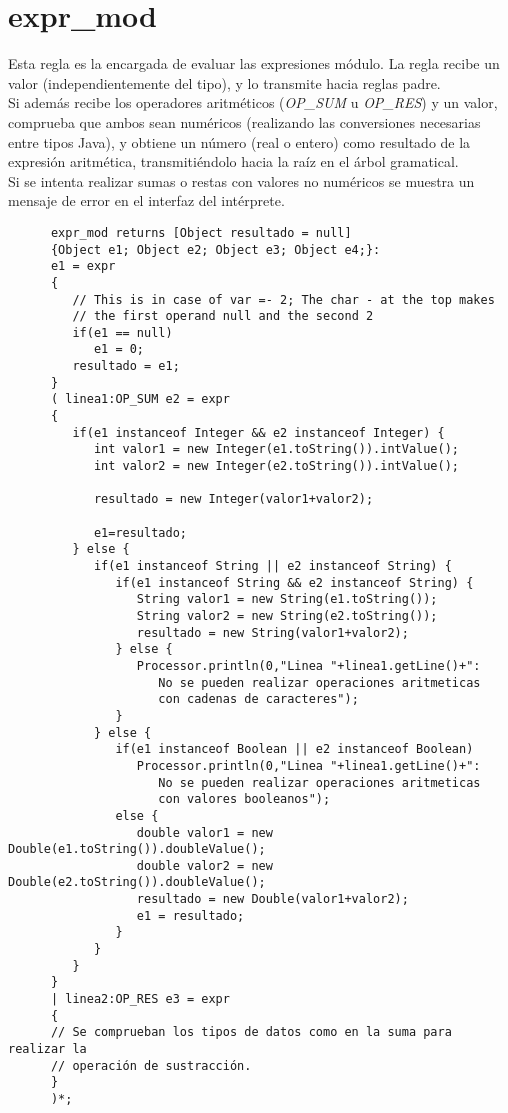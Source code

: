    \section{expr\_mod}
   Esta regla es la encargada de evaluar las expresiones módulo. La regla recibe un valor (independientemente del tipo),
   y lo transmite hacia reglas padre. \\

   Si además recibe los operadores aritméticos (\textit{OP\_SUM} u \textit{OP\_RES}) y un valor, comprueba que ambos sean numéricos 
   (realizando las conversiones necesarias entre tipos Java), y obtiene un número (real o entero) como resultado de la expresión aritmética,
   transmitiéndolo hacia la raíz en el árbol gramatical.\\

   Si se intenta realizar sumas o restas con valores no numéricos se muestra un mensaje de error en el interfaz del intérprete.
   \begin{lstlisting}
      expr_mod returns [Object resultado = null]
      {Object e1; Object e2; Object e3; Object e4;}: 
      e1 = expr
      {
         // This is in case of var =- 2; The char - at the top makes 
         // the first operand null and the second 2
         if(e1 == null)
            e1 = 0;
         resultado = e1;
      }
      ( linea1:OP_SUM e2 = expr
      {
         if(e1 instanceof Integer && e2 instanceof Integer) {
            int valor1 = new Integer(e1.toString()).intValue();
            int valor2 = new Integer(e2.toString()).intValue();
            
            resultado = new Integer(valor1+valor2);
            
            e1=resultado;
         } else {
            if(e1 instanceof String || e2 instanceof String) {
               if(e1 instanceof String && e2 instanceof String) {
                  String valor1 = new String(e1.toString());
                  String valor2 = new String(e2.toString());
                  resultado = new String(valor1+valor2);
               } else {
                  Processor.println(0,"Linea "+linea1.getLine()+":
                     No se pueden realizar operaciones aritmeticas
                     con cadenas de caracteres");
               }
            } else {
               if(e1 instanceof Boolean || e2 instanceof Boolean)
                  Processor.println(0,"Linea "+linea1.getLine()+":
                     No se pueden realizar operaciones aritmeticas
                     con valores booleanos");
               else {
                  double valor1 = new Double(e1.toString()).doubleValue();
                  double valor2 = new Double(e2.toString()).doubleValue();
                  resultado = new Double(valor1+valor2);
                  e1 = resultado;
               }
            }
         } 
      }
      | linea2:OP_RES e3 = expr
      {
      // Se comprueban los tipos de datos como en la suma para realizar la 
      // operación de sustracción.
      }
      )*;
   \end{lstlisting}

